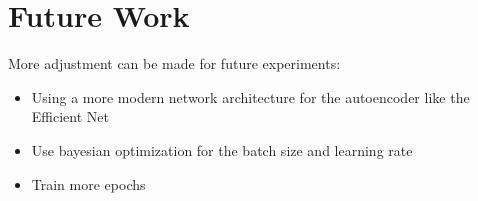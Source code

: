 \documentclass[journal]{IEEEtran}
\begin{document}
\section{Future Work}
More adjustment can be made for future experiments:

\begin{itemize}
\item Using a more modern network architecture for the autoencoder like the Efficient Net
\item Use bayesian optimization for the batch size and learning rate
\item Train more epochs
\end{itemize}



%


\end{document}
